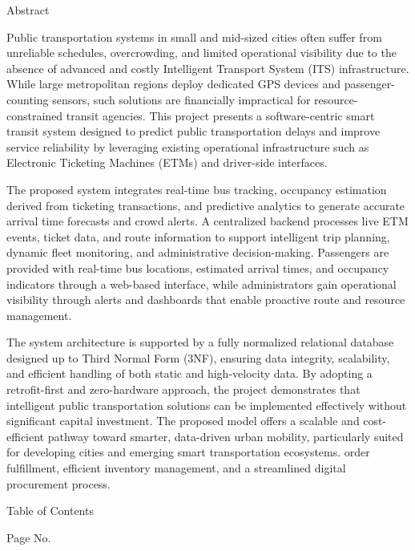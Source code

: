 Abstract


Public transportation systems in small and mid-sized cities often suffer from unreliable schedules, overcrowding, and limited operational visibility due to the absence of advanced and costly Intelligent Transport System (ITS) infrastructure. While large metropolitan regions deploy dedicated GPS devices and passenger-counting sensors, such solutions are financially impractical for resource-constrained transit agencies. This project presents a software-centric smart transit system designed to predict public transportation delays and improve service reliability by leveraging existing operational infrastructure such as Electronic Ticketing Machines (ETMs) and driver-side interfaces.

The proposed system integrates real-time bus tracking, occupancy estimation derived from ticketing transactions, and predictive analytics to generate accurate arrival time forecasts and crowd alerts. A centralized backend processes live ETM events, ticket data, and route information to support intelligent trip planning, dynamic fleet monitoring, and administrative decision-making. Passengers are provided with real-time bus locations, estimated arrival times, and occupancy indicators through a web-based interface, while administrators gain operational visibility through alerts and dashboards that enable proactive route and resource management.

The system architecture is supported by a fully normalized relational database designed up to Third Normal Form (3NF), ensuring data integrity, scalability, and efficient handling of both static and high-velocity data. By adopting a retrofit-first and zero-hardware approach, the project demonstrates that intelligent public transportation solutions can be implemented effectively without significant capital investment. The proposed model offers a scalable and cost-efficient pathway toward smarter, data-driven urban mobility, particularly suited for developing cities and emerging smart transportation ecosystems. order fulfillment, efficient inventory management, and a streamlined digital procurement process.












Table of Contents





												Page No.

